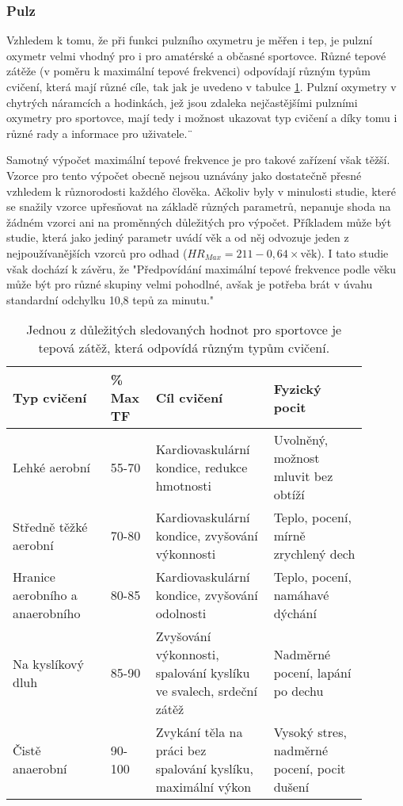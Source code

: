 \subsubsection {Pulz}
Vzhledem k tomu, že při funkci pulzního oxymetru je měřen i tep, je pulzní oxymetr velmi vhodný pro i pro amatérské a občasné sportovce. Různé tepové zátěže (v poměru k maximální tepové frekvenci) odpovídají různým typům cvičení, která mají různé cíle, tak jak je uvedeno v tabulce \ref{tab:MTF}. Pulzní oxymetry v chytrých náramcích a hodinkách, jež jsou zdaleka nejčastějšími pulzními oxymetry pro sportovce, mají tedy i možnost ukazovat typ cvičení a díky tomu i různé rady a informace pro uživatele.¨
\par Samotný výpočet maximální tepové frekvence je pro takové zařízení však těžší. Vzorce pro tento výpočet obecně nejsou uznávány jako dostatečně přesné vzhledem k různorodosti každého člověka. Ačkoliv byly v minulosti studie, které se snažily vzorce upřesňovat na základě různých parametrů, nepanuje shoda na žádném vzorci ani na proměnných důležitých pro výpočet. Příkladem může být studie, která jako jediný parametr uvádí věk a od něj odvozuje jeden z nejpoužívanějších vzorců pro odhad ($HR_{Max}=211-0,64\times\text{věk}$). I tato studie však dochází k závěru, že "Předpovídání maximální tepové frekvence podle věku může být pro různé skupiny velmi pohodlné, avšak je potřeba brát v úvahu standardní odchylku 10,8 tepů za minutu." \citep{maxHR}
\begin{table}[h]
    \centering
    \begin{tabular}{p{0.25\linewidth} | p{0.1\linewidth} | p{0.30\linewidth} | p{0.24\linewidth}}
        \textbf{Typ cvičení}            & \textbf{\% Max TF} & \textbf{Cíl cvičení}                                              & \textbf{Fyzický pocit}              \\ \hline
        Lehké aerobní                   & 55-70                    & Kardiovaskulární kondice, redukce hmotnosti                       & Uvolněný, možnost mluvit bez obtíží \\
        Středně těžké aerobní           & 70-80                    & Kardiovaskulární kondice, zvyšování výkonnosti                    & Teplo, pocení, mírně zrychlený dech \\
        Hranice aerobního a anaerobního & 80-85                    & Kardiovaskulární kondice, zvyšování odolnosti                     & Teplo, pocení, namáhavé dýchání     \\
        Na kyslíkový dluh               & 85-90                    & Zvyšování výkonnosti, spalování kyslíku ve svalech, srdeční zátěž & Nadměrné pocení, lapání po dechu    \\
        Čistě anaerobní                 & 90-100                   & Zvykání těla na práci bez spalování kyslíku, maximální výkon      & Vysoký stres, nadměrné pocení, pocit dušení
    \end{tabular}
    \caption[Typy cvičení podle maximální tepové frekvence]{Jednou z důležitých sledovaných hodnot pro sportovce je tepová zátěž, která odpovídá různým typům cvičení. \citep{tep}}%
    \label{tab:MTF}
\end{table}
